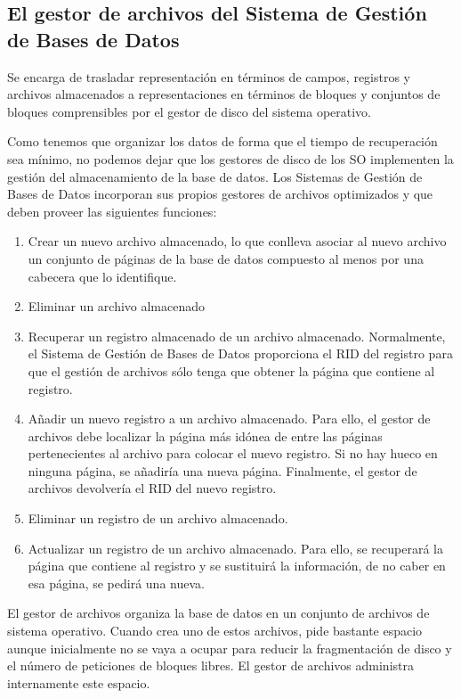 \documentclass[10pt,a4paper,spanish]{report}
\begin{document}
\textcolor[rgb]{1,0.2,0.3}{\subsection{El gestor de archivos del Sistema de Gestión de Bases de Datos}}
Se encarga de trasladar representación en términos de campos, registros y archivos almacenados a representaciones en términos de bloques y conjuntos de bloques comprensibles por el gestor de disco del sistema operativo.

Como tenemos que organizar los datos de forma que el tiempo de recuperación sea mínimo, no podemos dejar  que los gestores de disco de los SO implementen la gestión del almacenamiento de la base de datos. Los Sistemas de Gestión de Bases de Datos incorporan sus propios gestores de archivos optimizados y que deben proveer las siguientes funciones:

\begin{enumerate}[$\heartsuit$]
    \item Crear un nuevo archivo almacenado, lo que conlleva asociar al nuevo archivo un conjunto de páginas de la base de datos compuesto al menos por una cabecera que lo identifique.
    \item Eliminar un archivo almacenado
    \item Recuperar un registro almacenado de un archivo almacenado. Normalmente, el Sistema de Gestión de Bases de Datos proporciona el RID del registro para que el gestión de archivos sólo tenga que obtener la página que contiene al registro.
    \item Añadir un nuevo registro a un archivo almacenado. Para ello, el gestor de archivos debe localizar la página más idónea de entre las páginas pertenecientes al archivo para colocar el nuevo registro. Si no hay hueco en ninguna página, se añadiría una nueva página. Finalmente, el gestor de archivos devolvería el RID del nuevo registro.
    \item Eliminar un registro de un archivo almacenado.
    \item Actualizar un registro de un archivo almacenado. Para ello, se recuperará la página que contiene al registro y se sustituirá la información, de no caber en esa página, se pedirá una nueva.
\end{enumerate}

El gestor de archivos organiza la base de datos en un conjunto de archivos de sistema operativo. Cuando crea uno de estos archivos, pide bastante espacio aunque inicialmente no se vaya a ocupar para reducir la fragmentación de disco y el número de peticiones de bloques libres. El gestor de archivos administra internamente este espacio.
\end{document}

